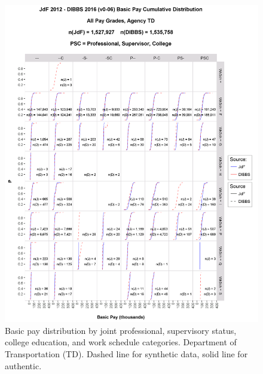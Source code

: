 \documentclass[10pt, letterpaper]{article}
\begin{document}
\begin{spacing}{1.0}
\begin{figure}[h]
    \centering
    \includegraphics[width=6.5in, trim={0 0 1in 1.5in}, clip]{JdFDIBBSBasicPayCDFTD.png}
    \caption{Basic pay distribution by joint professional, supervisory status, college education, and work schedule  categories.  Department of Transportation (TD).  Dashed line for synthetic data, solid line for authentic.}
    \label{figure:JdFDIBBSBasicPayCDFTD}
\end{figure}

\clearpage


\end{spacing}
\end{document}
